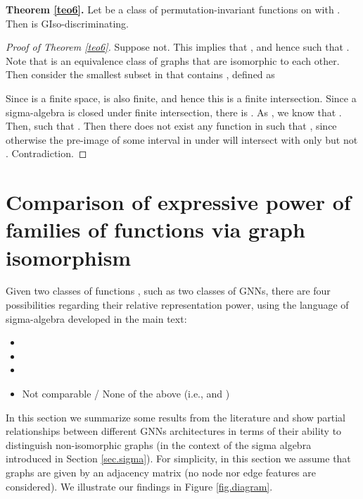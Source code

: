 \documentclass{article}
\begin{document}
\textbf{Theorem \ref{teo6}.} 
Let be  a class of permutation-invariant functions on  with . Then  is GIso-discriminating.

\begin{proof}[Proof of Theorem \ref{teo6}]
Suppose not. This implies that , and hence  such that . Note that  is an equivalence class of graphs that are isomorphic to each other. Then consider the smallest subset in  that contains , defined as 

Since  is a finite space,  is also finite, and hence this is a finite intersection. Since a sigma-algebra is closed under finite intersection, there is . As , we know that . Then,  such that . Then there does not exist any function  in  such that , since otherwise the pre-image of some interval in  under  will intersect with only  but not . Contradiction.
\end{proof}



\section{Comparison of expressive power of families of functions via graph isomorphism} \label{app.comparison}
Given two classes of functions , such as two classes of GNNs, there are four possibilities regarding their relative representation power, using the language of sigma-algebra developed in the main text:

\begin{itemize}
    \item  
    \item 
    \item 
    \item Not comparable / None of the above (i.e.,  and )
\end{itemize}

In this section we summarize some results from the literature and show partial relationships between different GNNs architectures in terms of their ability to distinguish non-isomorphic graphs (in the context of the sigma algebra introduced in Section \ref{sec.sigma}). For simplicity, in this section we assume that graphs are given by an adjacency matrix (no node nor edge features are considered). We illustrate our findings in Figure \ref{fig.diagram}.
\end{document}
